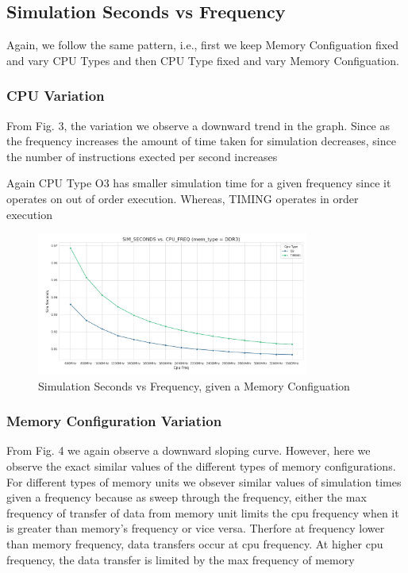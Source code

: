 \documentclass[12pt]{article}
\begin{document}
\subsection{Simulation Seconds vs Frequency}
Again, we follow the same pattern, i.e., first we keep Memory Configuation fixed and 
vary CPU Types and then CPU Type fixed and vary Memory Configuation.

\subsubsection{CPU Variation}
From Fig. 3, the variation we observe a downward trend in the graph. Since as the frequency increases the 
amount of time taken for simulation decreases, since the number of instructions exected per second increases

Again CPU Type O3 has smaller simulation time for a given frequency since it operates
on out of order execution. Whereas, TIMING operates in order execution

\begin{figure}[h!]
    \centering
    \includegraphics[width=0.8\textwidth]{sims_vs_freq.png}
    \caption{Simulation Seconds vs Frequency, given a Memory Configuation}
\end{figure}


\subsubsection{Memory Configuration Variation}

From Fig. 4 we again observe a downward sloping curve. However, here we observe
the exact similar values of the different types of memory configurations. For different types of memory units we obsever similar values of simulation times given a frequency because as sweep through the frequency, either the max frequency of transfer of data from memory unit limits the cpu frequency when it is greater than memory's frequency or vice versa. Therfore at frequency lower than memory frequency, data transfers occur at cpu frequency. At higher cpu frequency, the data transfer is limited by the max frequency of memory
\end{document}
